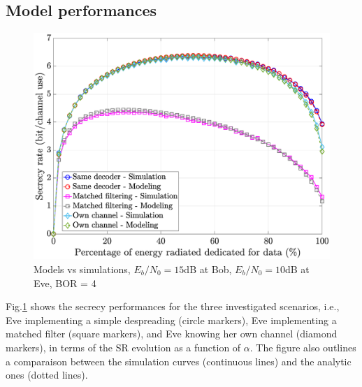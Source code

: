 \documentclass[journal,comsoc]{IEEEtran}
\let\MYoriglatexcaption\caption
\renewcommand{\caption}[2][\relax]{\MYoriglatexcaption[#2]{#2}}
\begin{document}
\subsection{Model performances}
\begin{figure}[h!t]
	\centering
	\includegraphics[width=1\linewidth]{graphs/SISO_no_corr_modelvsimu_EbN0b15_EbN0e10.eps}
	\caption{Models vs simulations, $E_b/N_0 = 15$dB at Bob,  $E_b/N_0 = 10$dB at Eve, BOR = 4}
	\label{fig_modelvssimu}
\end{figure}
Fig.\ref{fig_modelvssimu} shows the secrecy performances for the three investigated scenarios, i.e., Eve implementing a simple despreading (circle markers), Eve implementing a matched filter (square markers), and Eve knowing her own channel (diamond markers), in terms of the SR evolution as a function of $\alpha$. The figure also outlines a comparaison between the simulation curves (continuous lines) and the analytic ones (dotted lines).\\
\end{document}
